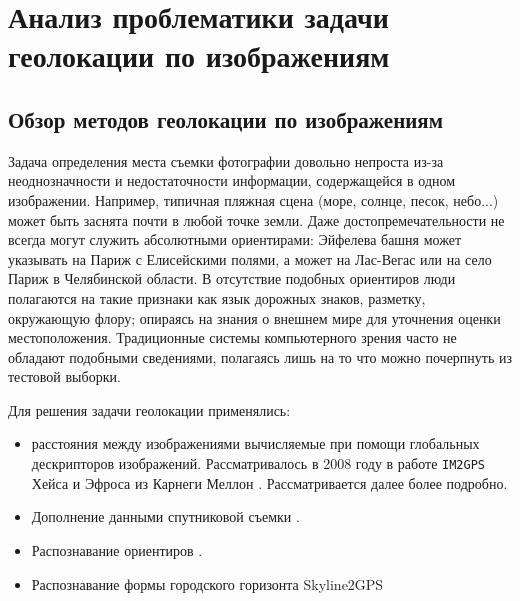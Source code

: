 \chapter{Анализ проблематики задачи геолокации по изображениям}
\label{chapter1}

\section{Обзор методов геолокации по изображениям}

Задача определения места съемки фотографии довольно непроста из-за неоднозначности и недостаточности информации, содержащейся в одном изображении. Например, типичная пляжная сцена (море, солнце, песок, небо...) может быть заснята почти в любой точке земли. Даже достопремечательности не всегда могут служить абсолютными ориентирами: Эйфелева башня может указывать на Париж с Елисейскими полями, а может на Лас-Вегас или на село Париж в Челябинской области. В отсутствие подобных ориентиров люди полагаются на такие признаки как язык дорожных знаков, разметку, окружающую флору; опираясь на знания о внешнем мире для уточнения оценки местоположения. Традиционные системы компьютерного зрения часто не обладают подобными сведениями, полагаясь лишь на то что можно почерпнуть из тестовой выборки.

Для решения задачи геолокации применялись:
\begin{itemize}
	\item расстояния между изображениями вычисляемые при помощи глобальных дескрипторов изображений. Рассматривалось в 2008 году  в работе \texttt{IM2GPS} Хейса и Эфроса из Карнеги Меллон \cite{im2gps}.
	Рассматривается далее более подробно.
	\item Дополнение данными спутниковой съемки \cite{lin2013cross}. 
	\item Распознавание ориентиров \cite{avrithis2010retrieving}.
	\item Распознавание формы городского горизонта Skyline2GPS \cite{ramalingam2010skyline2gps}
\end{itemize}

